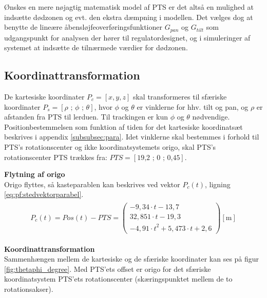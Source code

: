 Ønskes en mere nøjagtig matematisk model af PTS
er det altså en mulighed at indsætte dødzonen og evt. den ekstra dæmpning i modellen.
Det vælges dog at benytte de lineære åbensløjfeoverføringsfunktioner \(G_{pan}\) og \(G_{tilt}\)
som udgangspunkt for analysen der hører til regulatordesignet,
og i simuleringer af systemet at indsætte de tilnærmede værdier for dødzonen.

\subsection{Koordinattransformation}
\label{sec:koordinattransformation}
De kartesiske koordinater \(P_c=\left[x, y, z\right]\) skal transformeres til sfæriske koordinater
\(P_s=\left[\rho \text{ ; } \phi \text{ ; } \theta\right]\), hvor \(\phi\) og \(\theta\) er vinklerne for hhv. tilt og pan, og \(\rho\) er afstanden fra PTS til lerduen.
Til trackingen er kun \(\phi\) og \(\theta\) nødvendige.
Positionbestemmelsen som funktion af tiden for det kartesiske koordinatsæt beskrives i appendix \ref{subsubsec:para}.
Idet vinklerne skal bestemmes i forhold til PTS's rotationscenter og ikke koordinatsystemets origo,
skal PTS's rotationscenter PTS trækkes fra:
\(PTS=[\text{19,2 ; 0 ; 0,45}]\). 

\textbf{Flytning af origo}\\
Origo flyttes, så kasteparablen kan beskrives ved vektor \(P_c\left(t\right)\), ligning \ref{eq:pf:stedvektorparabel}.
\begin{align}
\begin{split}
{ P }_{ c }\left(t\right)=Pos\left( t \right) -PTS = \left( \begin{matrix} - 9,34\cdot t-13,7 \\32,851\cdot t-19,3
\\-{ 4,91\cdot t }^{ 2 }+5,473\cdot t+2,6\end{matrix} \right) [\text{m}]
\label{eq:pf:stedvektorparabel}
\end{split}
\end{align}

\textbf{Koordinattransformation}\\
Sammenhængen mellem de kartesiske og de sfæriske koordinater kan ses på figur \ref{fig:thetaphi_degree}. 
Med PTS'ets offset er origo for det sfæriske koordinatsystem PTS'ets rotationscenter (skæringspunktet mellem de to rotationsakser).

